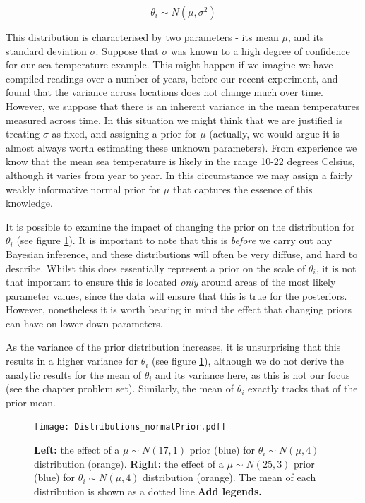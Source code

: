 \documentclass[11pt,fullpage]{book}
\begin{document}
\begin{equation}
\theta_i\sim N(\mu,\sigma^2)
\end{equation}

This distribution is characterised by two parameters - its mean $\mu$, and its standard deviation $\sigma$. Suppose that $\sigma$ was known to a high degree of confidence for our sea temperature example. This might happen if we imagine we have compiled readings over a number of years, before our recent experiment, and found that the variance across locations does not change much over time. However, we suppose that there is an inherent variance in the mean temperatures measured across time. In this situation we might think that we are justified is treating $\sigma$ as fixed, and assigning a prior for $\mu$ (actually, we would argue it is almost always worth estimating these unknown parameters). From experience we know that the mean sea temperature is likely in the range 10-22 degrees Celsius, although it varies from year to year. In this circumstance we may assign a fairly weakly informative normal prior for $\mu$ that captures the essence of this knowledge. 

It is possible to examine the impact of changing the prior on the distribution for $\theta_i$ (see figure \ref{fig:Distributions_normalPrior}). It is important to note that this is \textit{before} we carry out any Bayesian inference, and these distributions will often be very diffuse, and hard to describe. Whilst this does essentially represent a prior on the scale of $\theta_i$, it is not that important to ensure this is located \textit{only} around areas of the most likely parameter values, since the data will ensure that this is true for the posteriors. However, nonetheless it is worth bearing in mind the effect that changing priors can have on lower-down parameters.

As the variance of the prior distribution increases, it is unsurprising that this results in a higher variance for $\theta_i$ (see figure \ref{fig:Distributions_normalPrior}), although we do not derive the analytic results for the mean of $\theta_i$ and its variance here, as this is not our focus (see the chapter problem set). Similarly, the mean of $\theta_i$ exactly tracks that of the prior mean.

\begin{figure}
\centering
\scalebox{0.5} 
{\texttt{[image: Distributions\_normalPrior.pdf]}}
\caption{\textbf{Left:} the effect of a $\mu\sim N(17,1)$ prior (blue) for $\theta_i\sim N(\mu,4)$ distribution (orange). \textbf{Right:} the effect of a $\mu\sim N(25,3)$ prior (blue) for $\theta_i\sim N(\mu,4)$ distribution (orange). The mean of each distribution is shown as a dotted line.\textbf{Add legends.}}\label{fig:Distributions_normalPrior}
\end{figure}
\end{document}
